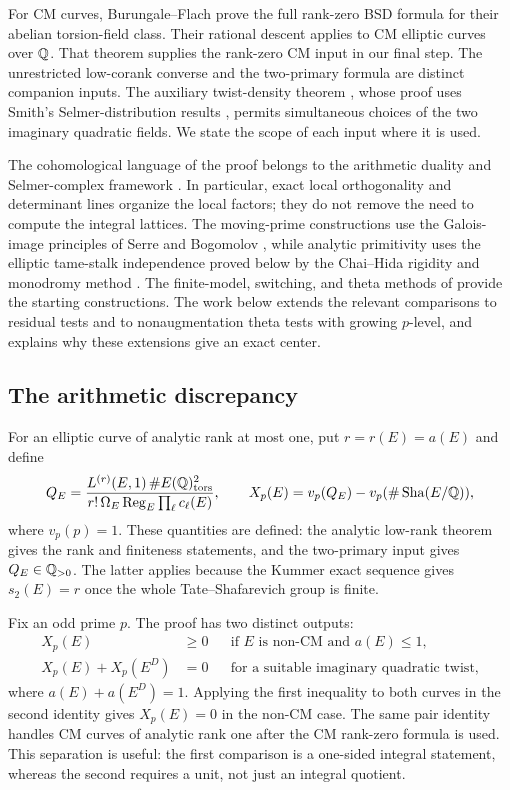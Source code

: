 For CM curves, Burungale--Flach \cite{BurungaleFlach} prove the full
rank-zero BSD formula for their abelian torsion-field class.
Their rational descent applies to CM elliptic curves over \(\mathbb Q\).
That theorem supplies the rank-zero CM input in our final step.
The unrestricted low-corank converse \cite{C} and the two-primary
formula \cite{B} are distinct companion inputs. The auxiliary
twist-density theorem \cite{Goldfeld}, whose proof uses Smith's
Selmer-distribution results \cite{Smith}, permits simultaneous
choices of the two imaginary quadratic fields. We state the
scope of each input where it is used.

The cohomological language of the proof belongs to the arithmetic
duality and Selmer-complex framework
\cite{BlochKato,Milne,Nekovar}. In particular, exact local
orthogonality and determinant lines organize the local factors;
they do not remove the need to compute the integral lattices.
The moving-prime constructions use the Galois-image principles
of Serre and Bogomolov \cite{Serre,Bogomolov}, while analytic
primitivity uses the elliptic tame-stalk independence proved below
by the Chai--Hida rigidity and monodromy method
\cite{ChaiOrd,HidaMu}. The finite-model, switching, and theta
methods of \cite{B,C,Dv} provide the starting constructions.
The work below extends the relevant comparisons to residual
tests and to nonaugmentation theta tests with growing \(p\)-level,
and explains why these extensions give an exact center.

\subsection{The arithmetic discrepancy}

For an elliptic curve of analytic rank at most one, put
$r=r(E)=a(E)$ and define
\begin{equation}\label{eq:normalized-quotient}
 Q_E=\frac{L^{(r)}(E,1)\,\#E(\mathbb Q)_{\rm tors}^{2}}
            {r!\,\Omega_E\operatorname{Reg}_E\prod_\ell c_\ell(E)},
 \qquad
 X_p(E)=v_p(Q_E)-v_p(\#\operatorname{Sha}(E/\mathbb Q)),
\end{equation}
where $v_p(p)=1$. These quantities are defined: the analytic low-rank
theorem gives the rank and finiteness statements, and the two-primary
input gives $Q_E\in\mathbb Q_{>0}$. The latter applies because the Kummer exact
sequence gives $s_2(E)=r$ once the whole Tate--Shafarevich group is
finite.

Fix an odd prime $p$. The proof has two distinct outputs:
\begin{align}
 X_p(E)&\geq0 &&\text{if $E$ is non-CM and $a(E)\leq1$},
                                      \label{eq:intro-inequality}\\
 X_p(E)+X_p(E^D)&=0 &&\text{for a suitable imaginary quadratic twist},
                                      \label{eq:intro-pair}
\end{align}
where $a(E)+a(E^D)=1$. Applying the first inequality to both curves
in the second identity gives $X_p(E)=0$ in the non-CM case. The same
pair identity handles CM curves of analytic rank one after the CM
rank-zero formula is used. This separation is useful: the first
comparison is a one-sided integral statement, whereas the second
requires a unit, not just an integral quotient.

